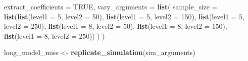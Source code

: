 \documentclass[man]{apa6}
\newenvironment{Shaded}{\begin{snugshade}}{\end{snugshade}}
\newcommand{\DataTypeTok}[1]{\textcolor[rgb]{0.13,0.29,0.53}{#1}}
\newcommand{\DecValTok}[1]{\textcolor[rgb]{0.00,0.00,0.81}{#1}}
\newcommand{\KeywordTok}[1]{\textcolor[rgb]{0.13,0.29,0.53}{\textbf{#1}}}
\newcommand{\NormalTok}[1]{#1}
\newcommand{\OperatorTok}[1]{\textcolor[rgb]{0.81,0.36,0.00}{\textbf{#1}}}
\newcommand{\OtherTok}[1]{\textcolor[rgb]{0.56,0.35,0.01}{#1}}
\newcommand{\StringTok}[1]{\textcolor[rgb]{0.31,0.60,0.02}{#1}}
\begin{document}
\begin{Shaded}
\begin{Highlighting}[]
  \DataTypeTok{extract_coefficients =} \OtherTok{TRUE}\NormalTok{,}
  \DataTypeTok{vary_arguments =} \KeywordTok{list}\NormalTok{(}
    \DataTypeTok{sample_size =} \KeywordTok{list}\NormalTok{(}\KeywordTok{list}\NormalTok{(}\DataTypeTok{level1 =} \DecValTok{5}\NormalTok{, }\DataTypeTok{level2 =} \DecValTok{50}\NormalTok{),}
                       \KeywordTok{list}\NormalTok{(}\DataTypeTok{level1 =} \DecValTok{5}\NormalTok{, }\DataTypeTok{level2 =} \DecValTok{150}\NormalTok{),}
                       \KeywordTok{list}\NormalTok{(}\DataTypeTok{level1 =} \DecValTok{5}\NormalTok{, }\DataTypeTok{level2 =} \DecValTok{250}\NormalTok{),}
                       \KeywordTok{list}\NormalTok{(}\DataTypeTok{level1 =} \DecValTok{8}\NormalTok{, }\DataTypeTok{level2 =} \DecValTok{50}\NormalTok{),}
                       \KeywordTok{list}\NormalTok{(}\DataTypeTok{level1 =} \DecValTok{8}\NormalTok{, }\DataTypeTok{level2 =} \DecValTok{150}\NormalTok{),}
                       \KeywordTok{list}\NormalTok{(}\DataTypeTok{level1 =} \DecValTok{8}\NormalTok{, }\DataTypeTok{level2 =} \DecValTok{250}\NormalTok{))}
\NormalTok{  )}
\NormalTok{)}

\NormalTok{long_model_miss <-}\StringTok{ }\KeywordTok{replicate_simulation}\NormalTok{(sim_arguments) }
\end{Highlighting}
\end{Shaded}

\begin{Shaded}
\end{Shaded}
\end{document}
